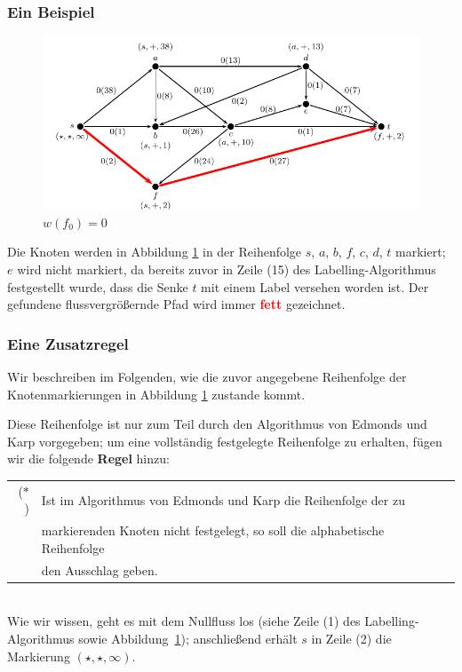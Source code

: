 \documentclass[smaller]{beamer}
\begin{document}
\begin{frame}
 \frametitle{Ein Beispiel}
 \begin{center}
  \begin{figure}
   \includegraphics[scale=0.8]{fig23.pdf}
   \caption{$w(f_0) = 0$}
   \label{abb:9:2}
  \end{figure}
 \end{center}

 Die Knoten werden in Abbildung \ref{abb:9:2} in der Reihenfolge $s$, $a$, $b$, $f$, $c$, $d$, $t$ markiert; $e$ wird nicht markiert, da bereits zuvor in Zeile (15) des Labelling-Algorithmus festgestellt wurde, dass die Senke $t$ mit einem Label versehen worden ist. Der gefundene flussvergrößernde Pfad wird immer \textcolor{red}{\textbf{fett}} gezeichnet.
\end{frame}

\begin{frame}
 \frametitle{Eine Zusatzregel}
  Wir beschreiben im Folgenden, wie die zuvor angegebene Reihenfolge der Knotenmarkierungen in Abbildung \ref{abb:9:2} zustande kommt. \\ \vspace*{0.2cm}
  
  Diese Reihenfolge ist nur zum Teil durch den Algorithmus von Edmonds und Karp vorgegeben; um eine vollständig festgelegte Reihenfolge zu erhalten, fügen wir die folgende \textbf{Regel} hinzu: \\ \vspace*{0.2cm}

\begin{tabular}{rl}
($*$)& Ist im Algorithmus von Edmonds und Karp die Reihenfolge der zu \\
         & markierenden Knoten nicht festgelegt, so soll die \alert{alphabetische Reihenfolge} \\
         & den Ausschlag geben.
\end{tabular}
\label{page:9:8}
\\ \vspace*{0.2cm}
Wie wir wissen, geht es mit dem Nullfluss los (siehe Zeile (1) des Labelling-Algorithmus sowie Abbildung~\ref{abb:9:2}); anschließend erhält $s$ in Zeile (2) die Markierung $(\star,\star,\infty)$.
\end{frame}
\end{document}
